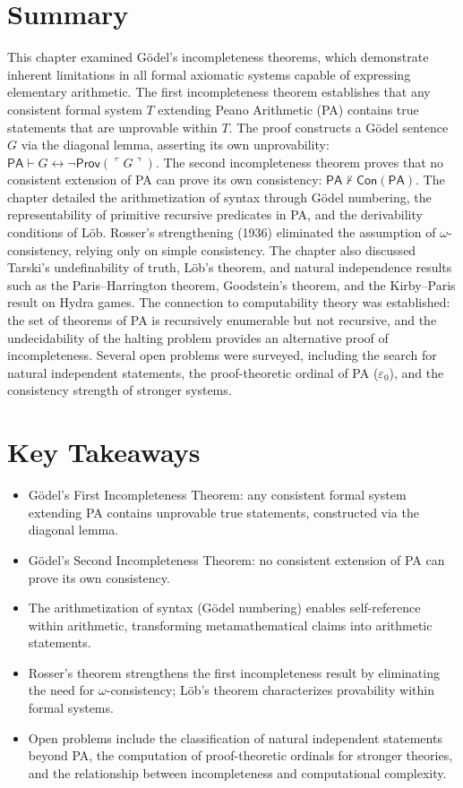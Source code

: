 \section{Summary}
\label{sec:godel:summary}

This chapter examined Gödel's incompleteness theorems, which demonstrate inherent limitations in all formal axiomatic systems capable of expressing elementary arithmetic. The first incompleteness theorem establishes that any consistent formal system $T$ extending Peano Arithmetic (PA) contains true statements that are unprovable within $T$. The proof constructs a Gödel sentence $G$ via the diagonal lemma, asserting its own unprovability: $\mathsf{PA} \vdash G \leftrightarrow \neg \mathsf{Prov}(\ulcorner G \urcorner)$. The second incompleteness theorem proves that no consistent extension of PA can prove its own consistency: $\mathsf{PA} \nvdash \mathsf{Con}(\mathsf{PA})$. The chapter detailed the arithmetization of syntax through Gödel numbering, the representability of primitive recursive predicates in PA, and the derivability conditions of Löb. Rosser's strengthening (1936) eliminated the assumption of $\omega$-consistency, relying only on simple consistency. The chapter also discussed Tarski's undefinability of truth, Löb's theorem, and natural independence results such as the Paris--Harrington theorem, Goodstein's theorem, and the Kirby--Paris result on Hydra games. The connection to computability theory was established: the set of theorems of PA is recursively enumerable but not recursive, and the undecidability of the halting problem provides an alternative proof of incompleteness. Several open problems were surveyed, including the search for natural independent statements, the proof-theoretic ordinal of PA ($\varepsilon_0$), and the consistency strength of stronger systems.

\section*{Key Takeaways}
\begin{itemize}
\item Gödel's First Incompleteness Theorem: any consistent formal system extending PA contains unprovable true statements, constructed via the diagonal lemma.
\item Gödel's Second Incompleteness Theorem: no consistent extension of PA can prove its own consistency.
\item The arithmetization of syntax (Gödel numbering) enables self-reference within arithmetic, transforming metamathematical claims into arithmetic statements.
\item Rosser's theorem strengthens the first incompleteness result by eliminating the need for $\omega$-consistency; Löb's theorem characterizes provability within formal systems.
\item Open problems include the classification of natural independent statements beyond PA, the computation of proof-theoretic ordinals for stronger theories, and the relationship between incompleteness and computational complexity.
\end{itemize}

